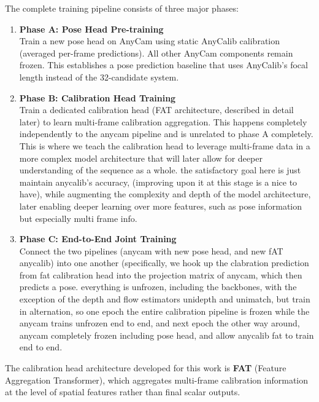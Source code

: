 The complete training pipeline consists of three major phases:

\begin{enumerate}
    \item \textbf{Phase A: Pose Head Pre-training} \\
    Train a new pose head on AnyCam using static AnyCalib calibration (averaged per-frame predictions). All other AnyCam components remain frozen. This establishes a pose prediction baseline that uses AnyCalib's focal length instead of the 32-candidate system.

    \item \textbf{Phase B: Calibration Head Training} \\
    Train a dedicated calibration head (FAT architecture, described in detail later) to learn multi-frame calibration aggregation. This happens completely independently to the anycam pipeline and is unrelated to phase A completely. This is where we teach the calibration head to leverage multi-frame data in a more complex model architecture that will later allow for deeper understanding of the sequence as a whole. the satisfactory goal here is just maintain anycalib's accuracy, (improving upon it at this stage is a nice to have), while augmenting the complexity and depth of the model architecture, later enabling deeper learning over more features, such as pose information but especially multi frame info.

    \item \textbf{Phase C: End-to-End Joint Training} \\
    Connect the two pipelines (anycam with new pose head, and new fAT anycalib) into one another (specifically, we hook up the clabration prediction from fat calibration head into the projection matrix of anycam, which then predicts a pose. everything is unfrozen, including the backbones, with the exception of the depth and flow estimators unidepth and unimatch, but train in alternation, so one epoch the entire calibration pipeline is frozen while the anycam trains unfrozen end to end, and next epoch the other way around, anycam completely frozen including pose head, and allow anycalib fat to train end to end.
\end{enumerate}

The calibration head architecture developed for this work is \textbf{FAT} (Feature Aggregation Transformer), which aggregates multi-frame calibration information at the level of spatial features rather than final scalar outputs.


